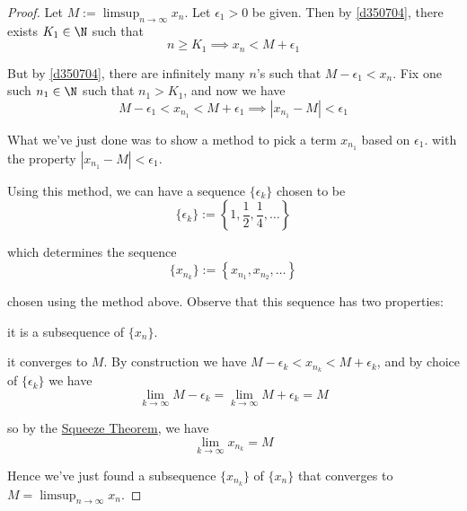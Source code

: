 \begin{proof}
   Let $M:=\displaystyle\limsup_{n\to\infty}x_n$. Let $\epsilon_1>0$
  be given. Then by \autoref{d350704}, there exists $K_1\in\N$ such
  that
  $$
    n\geq K_1\implies x_n<M+\epsilon_1
  $$

  But by \autoref{d350704}, there are infinitely many $n$'s such that
  $M-\epsilon_1<x_n$. Fix one such $n_1\in\N$ such that $n_1>K_1$, and now we
  have
  $$
    M-\epsilon_1<x_{n_1}<M+\epsilon_1\implies|x_{n_1}-M|<\epsilon_1
  $$

  What we've just done was to show a method to pick a term $x_{n_1}$ based on
  $\epsilon_1$. with the property $|x_{n_1}-M|<\epsilon_1$.

  Using this method, we can have a sequence $\{\epsilon_k\}$ chosen to be
  $$
    \{\epsilon_k\}:=\left\{1,\frac12,\frac14,\ldots\right\}
  $$

  which determines the sequence
  $$
    \{x_{n_k}\}:=\left\{x_{n_1},x_{n_2},\ldots\right\}
  $$

  chosen using the method above. Observe that this sequence has two properties:
  \begin{enumerati}
    \item it is a subsequence of $\{x_n\}$.
    \item it converges to $M$. By construction we have
          $M-\epsilon_k<x_{n_k}<M+\epsilon_k$, and by choice of
          $\{\epsilon_k\}$ we have
    $$
      \lim_{k\to\infty}M-\epsilon_k=\lim_{k\to\infty}M+\epsilon_k=M
    $$

    so by the \href{c3364d9}{Squeeze Theorem}, we have
    $$
      \lim_{k\to\infty}x_{n_k}=M
    $$
  \end{enumerati}

  Hence we've just found a subsequence $\{x_{n_k}\}$ of $\{x_n\}$ that
  converges to $M=\displaystyle\limsup_{n\to\infty}x_n$.
\end{proof}
